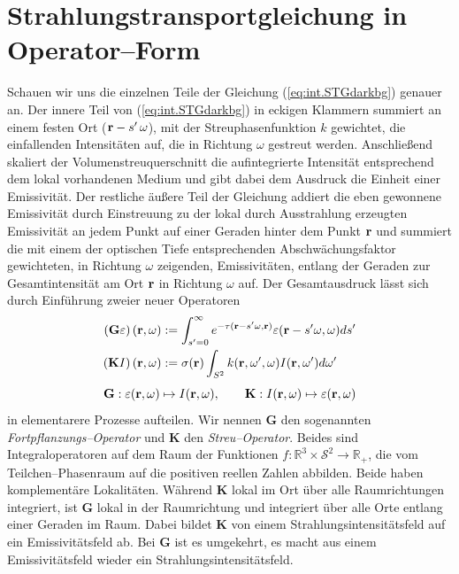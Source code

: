 	\section{Strahlungstransportgleichung in Operator--Form}
	Schauen wir uns die einzelnen Teile der Gleichung (\ref{eq:int.STGdarkbg}) genauer an.
	Der innere Teil von (\ref{eq:int.STGdarkbg}) in eckigen Klammern summiert an einem festen Ort ($\mathbf{r}-s'\,\omega$), mit der Streuphasenfunktion $k$ gewichtet, die einfallenden Intensitäten auf, die in Richtung $\omega$ gestreut werden. Anschließend skaliert der Volumenstreuquerschnitt die aufintegrierte Intensität entsprechend dem lokal vorhandenen Medium und gibt dabei dem Ausdruck die Einheit einer Emissivität.
	Der restliche äußere Teil der Gleichung addiert die eben gewonnene Emissivität durch Einstreuung zu der lokal durch Ausstrahlung erzeugten Emissivität an jedem Punkt auf einer Geraden hinter dem Punkt $\mathbf{r}$ und summiert die mit einem der optischen Tiefe entsprechenden Abschwächungsfaktor gewichteten, in Richtung $\omega$ zeigenden, Emissivitäten, entlang der Geraden zur Gesamtintensität am Ort $\mathbf{r}$ in Richtung $\omega$ auf.
	Der Gesamtausdruck lässt sich durch Einführung zweier neuer Operatoren
	\begin{align*}
		\left(\mathbf{G}\varepsilon\right)(\mathbf{r},\omega)&:=\int_{s'=0}^\infty e^{-\tau(\mathbf{r}-s' \omega,\mathbf{r})}\varepsilon(\mathbf{r}-s' \omega,\omega) ds' \\
		\left(\mathbf{K}I\right)(\mathbf{r},\omega)&:=\sigma(\mathbf{r})\int_{S^2} k(\mathbf{r},\omega',\omega) I(\mathbf{r},\omega') d\omega'
	\end{align*}
	\begin{equation*}
		\mathbf{G} : \varepsilon(\mathbf{r},\omega) \mapsto I(\mathbf{r},\omega) , \qquad
		\mathbf{K} : I(\mathbf{r},\omega) \mapsto \varepsilon(\mathbf{r},\omega)
	\end{equation*}
	in elementarere Prozesse aufteilen. Wir nennen $\mathbf{G}$ den sogenannten {\em Fortpflanzungs--Operator} und $\mathbf{K}$ den {\em Streu--Operator}. Beides sind Integraloperatoren auf dem Raum der Funktionen $f : \mathbb{R}^3 \times \mathcal{S}^2 \to \mathbb{R}_+$, die vom Teilchen--Phasenraum auf die positiven reellen Zahlen abbilden. Beide haben komplementäre Lokalitäten. Während $\mathbf{K}$ lokal im Ort über alle Raumrichtungen integriert, ist $\mathbf{G}$ lokal in der Raumrichtung und integriert über alle Orte entlang einer Geraden im Raum. Dabei bildet $\mathbf{K}$ von einem Strahlungsintensitätsfeld auf ein Emissivitätsfeld ab. Bei $\mathbf{G}$ ist es umgekehrt, es macht aus einem Emissivitätsfeld wieder ein Strahlungsintensitätsfeld.
